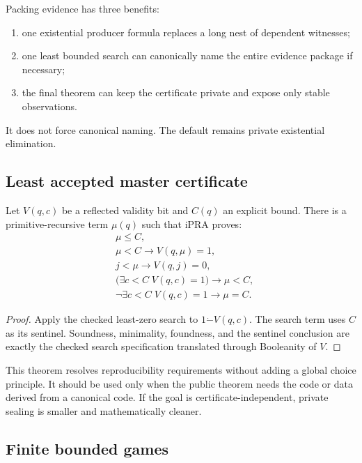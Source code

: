 Packing evidence has three benefits:

\begin{enumerate}
\item one existential producer formula replaces a long nest of dependent witnesses;
\item one least bounded search can canonically name the entire evidence package if necessary;
\item the final theorem can keep the certificate private and expose only stable observations.
\end{enumerate}

It does not force canonical naming.  The default remains private existential elimination.

\subsection{Least accepted master certificate}

\begin{theorem}
Let \(V(q,c)\) be a reflected validity bit and \(C(q)\) an explicit bound.  There is a primitive-recursive term \(\mu(q)\) such that iPRA proves:
\[
\begin{aligned}
&\mu\le C,\\
&\mu<C\to V(q,\mu)=1,\\
&j<\mu\to V(q,j)=0,\\
&\bigl(\exists c<C\;V(q,c)=1\bigr)\to \mu<C,\\
&\neg\exists c<C\;V(q,c)=1\to\mu=C.
\end{aligned}
\]
\end{theorem}
\begin{proof}
Apply the checked least-zero search to \(1\mathbin{\dot-}V(q,c)\).  The search term uses \(C\) as its sentinel.  Soundness, minimality, foundness, and the sentinel conclusion are exactly the checked search specification translated through Booleanity of \(V\).
\end{proof}

This theorem resolves reproducibility requirements without adding a global choice principle.  It should be used only when the public theorem needs the code or data derived from a canonical code.  If the goal is certificate-independent, private sealing is smaller and mathematically cleaner.

\subsection{Finite bounded games}

